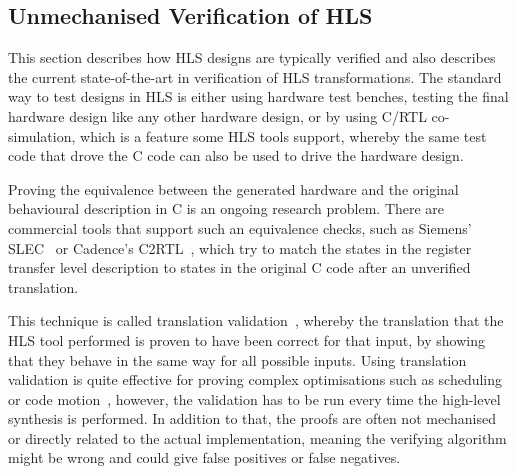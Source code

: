 \subsection{Unmechanised Verification of HLS}%
\label{sec:bg:unmechanised-verification-of-hls}

This section describes how \gls{HLS} designs are typically verified and also
describes the current state-of-the-art in verification of \gls{HLS}
transformations.  The standard way to test designs in \gls{HLS} is either using
hardware test benches, testing the final hardware design like any other hardware
design, or by using C/RTL co-simulation, which is a feature some \gls{HLS} tools
support, whereby the same test code that drove the C code can also be used to
drive the hardware design.

Proving the equivalence between the generated hardware and the original
behavioural description in C is an ongoing research problem.  There are
commercial tools that support such an equivalence checks, such as Siemens'
SLEC~\cite[]{chauhan20_formal_ensur_equiv_c_rtl} or Cadence's
C2RTL~\cite[]{cadence23_j}, which try to match the states in the register
transfer level description to states in the original C code after an unverified
translation.

This technique is called translation validation~\cite{pnueli98_trans}, whereby
the translation that the HLS tool performed is proven to have been correct for
that input, by showing that they behave in the same way for all possible inputs.
Using translation validation is quite effective for proving complex
optimisations such as scheduling~\cite{kim04_autom_fsmd,
  karfa06_formal_verif_method_sched_high_synth,
  chouksey20_verif_sched_condit_behav_high_level_synth} or code
motion~\cite{banerjee14_verif_code_motion_techn_using_value_propag,
  chouksey19_trans_valid_code_motion_trans_invol_loops}, however, the validation
has to be run every time the high-level synthesis is performed.  In addition to
that, the proofs are often not mechanised or directly related to the actual
implementation, meaning the verifying algorithm might be wrong and could give
false positives or false negatives.

